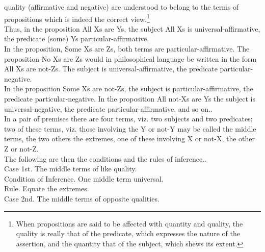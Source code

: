 \documentclass{article}
\begin{document}
{{{{quality (affirmative and negative) are understood to belong to the terms of
propositions which is indeed the correct view.\footnote[4]{\footnotesize{When propositions are said to be affected with quantity and quality, the quality is really
that of the predicate, which expresses the nature of the assertion, and the quantity that of
the subject, which shews its extent.}}\vspace{.1in}\\
\hspace*{.1in} Thus, in the proposition All Xs are Ys, the subject All Xs is universal-affirmative, the predicate (some) Ys particular-affirmative.\vspace{.1in}\\
\hspace*{.2in} In the proposition, Some Xs are Zs, both terms are particular-affirmative.
The proposition No Xs are Zs would in philosophical language be written in
the form All Xs are not-Zs. The subject is universal-affirmative, the predicate
particular-negative.\vspace{.1in}\\
\hspace*{.2in} In the proposition Some Xs are not-Zs, the subject is particular-affirmative,
the predicate particular-negative. In the proposition All not-Xs are Ys the
subject is universal-negative, the predicate particular-affirmative, and so on..\vspace{.1in}\\
\hspace*{.2in} In a pair of premises there are four terms, viz. two subjects and two predicates;
two of these terms, viz. those involving the Y or not-Y may be called the
middle terms, the two others the extremes, one of these involving X or not-X,
the other Z or not-Z.\vspace{.1in}\\
\hspace*{.2in} 
The following are then the conditions and the rules of inference..\vspace{.1in}\\
\hspace*{.2in} 
Case 1st. The middle terms of like quality.\\
Condition of Inference. One middle term universal.\\
Rule. Equate the extremes.\vspace{.1in}\\
\hspace*{.2in} 
Case 2nd. The middle terms of opposite qualities.\\
}}}}
\end{document}
